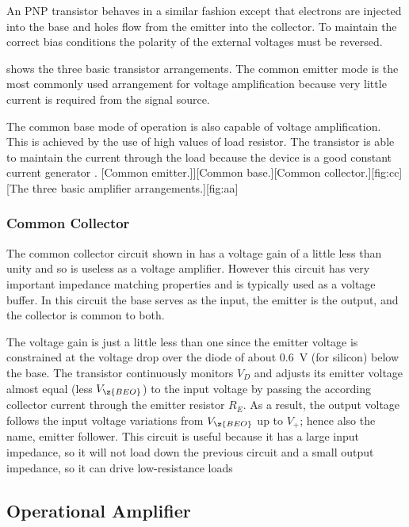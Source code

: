 An PNP transistor behaves in a similar fashion except that electrons are injected into the base and holes flow from the emitter into the collector. To maintain the correct bias conditions the polarity of the external voltages must be reversed.\par
{} shows the three basic transistor arrangements. The common emitter mode is the most commonly used arrangement for voltage amplification because very little current is required from the signal source.\par
The common base mode of operation is also capable of voltage amplification. This is achieved by the use of high values of load resistor. The transistor is able to maintain the current through the load because the device is a good constant current generator \cite{olsen}.
\subfigs[\subfig[.3]{.2}{commonemitter}[Common emitter.]]{[Common base.]}{[Common collector.][fig:cc]}[The three basic amplifier arrangements.][fig:aa]

\subsubsection{Common Collector}
The common collector circuit shown in  has a voltage gain of a little less than unity and so is useless as a voltage amplifier. However this circuit has very important impedance matching properties and is typically used as a voltage buffer. In this circuit the base serves as the input, the emitter is the output, and the collector is common to both.\par
The voltage gain is just a little less than one since the emitter voltage is constrained at the voltage drop over the diode of about \SI{0.6}{\volt} (for silicon) below the base. The transistor continuously monitors $V_{D}$ and adjusts its emitter voltage almost equal (less $V_{\z{BEO}}$) to the input voltage by passing the according collector current through the emitter resistor $R_{E}$. As a result, the output voltage follows the input voltage variations from $V_{\z{BEO}}$ up to $V_{+}$; hence also the name, emitter follower.
This circuit is useful because it has a large input impedance, so it will not load down the previous circuit and a small output impedance, so it can drive low-resistance loads

\subsection{Operational Amplifier}

